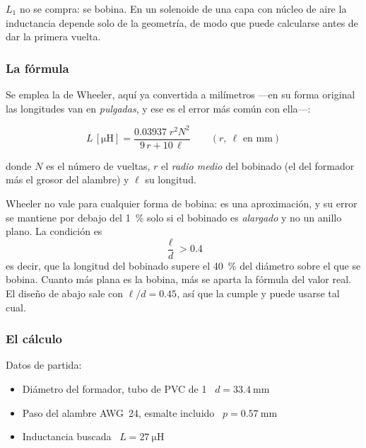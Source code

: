 \documentclass[11pt,a4paper]{article}
\begin{document}
$L_1$ no se compra: se bobina. En un solenoide de una capa con núcleo de aire la
inductancia depende solo de la geometría, de modo que puede calcularse antes de dar la
primera vuelta.

\subsubsection{La fórmula}

Se emplea la de Wheeler, aquí ya convertida a milímetros ---en su forma original las
longitudes van en \emph{pulgadas}, y ese es el error más común con ella---:

\begin{equation}
    L\,[\unit{\micro\henry}] = \frac{\num{0.03937}\; r^{2} N^{2}}{9\,r + 10\,\ell}
    \qquad (r,\ \ell \text{ en mm})
    \label{eq:wheeler}
\end{equation}

\noindent donde $N$ es el número de vueltas, $r$ el \emph{radio medio} del bobinado (el
del formador más el grosor del alambre) y $\ell$ su longitud.

Wheeler no vale para cualquier forma de bobina: es una aproximación, y su error se
mantiene por debajo del \qty{1}{\percent} solo si el bobinado es \emph{alargado} y no un
anillo plano. La condición es
%
\begin{equation*}
    \frac{\ell}{d} > \num{0.4}
\end{equation*}
%
\noindent es decir, que la longitud del bobinado supere el \qty{40}{\percent} del
diámetro sobre el que se bobina. Cuanto más plana es la bobina, más se aparta la
fórmula del valor real. El diseño de abajo sale con $\ell/d = \num{0.45}$, así que la
cumple y puede usarse tal cual.

\subsubsection{El cálculo}

\noindent Datos de partida:

\begin{itemize}[leftmargin=1.4em, itemsep=1pt, topsep=4pt]
    \item Diámetro del formador, tubo de PVC de 1\textquotedbl{}
          \dotfill\ $d = \qty{33.4}{\milli\metre}$
    \item Paso del alambre AWG~24, esmalte incluido
          \dotfill\ $p = \qty{0.57}{\milli\metre}$
    \item Inductancia buscada
          \dotfill\ $L = \qty{27}{\micro\henry}$
\end{itemize}
\end{document}
